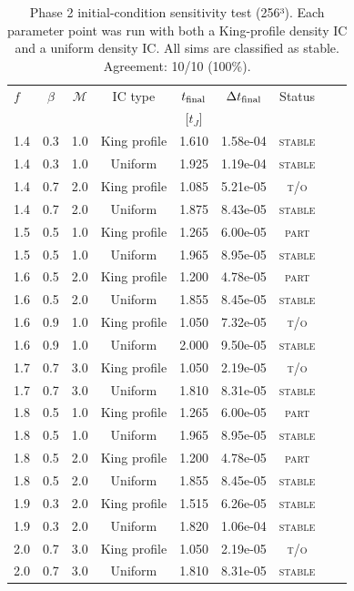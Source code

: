 \begin{table}
\centering
\caption{Phase 2 initial-condition sensitivity test (256³). Each parameter
  point was run with both a King-profile density IC and a uniform density IC.
  All sims are classified as stable. Agreement: 10/10 (100\%).}
\label{tab:phase2_ic}
\begin{tabular}{lcccccccc}
\hline
$f$ & $\beta$ & $\mathcal{M}$ & IC type & $t_{\rm final}$ & $\Delta t_{\rm final}$ & Status \\
 & & & & [$t_J$] & & \\
\hline
  1.4 & 0.3 & 1.0 & King profile & 1.610 & 1.58e-04 & \textsc{stable} \\
  1.4 & 0.3 & 1.0 & Uniform & 1.925 & 1.19e-04 & \textsc{stable} \\
  1.4 & 0.7 & 2.0 & King profile & 1.085 & 5.21e-05 & \textsc{t/o} \\
  1.4 & 0.7 & 2.0 & Uniform & 1.875 & 8.43e-05 & \textsc{stable} \\
  1.5 & 0.5 & 1.0 & King profile & 1.265 & 6.00e-05 & \textsc{part} \\
  1.5 & 0.5 & 1.0 & Uniform & 1.965 & 8.95e-05 & \textsc{stable} \\
  1.6 & 0.5 & 2.0 & King profile & 1.200 & 4.78e-05 & \textsc{part} \\
  1.6 & 0.5 & 2.0 & Uniform & 1.855 & 8.45e-05 & \textsc{stable} \\
  1.6 & 0.9 & 1.0 & King profile & 1.050 & 7.32e-05 & \textsc{t/o} \\
  1.6 & 0.9 & 1.0 & Uniform & 2.000 & 9.50e-05 & \textsc{stable} \\
  1.7 & 0.7 & 3.0 & King profile & 1.050 & 2.19e-05 & \textsc{t/o} \\
  1.7 & 0.7 & 3.0 & Uniform & 1.810 & 8.31e-05 & \textsc{stable} \\
  1.8 & 0.5 & 1.0 & King profile & 1.265 & 6.00e-05 & \textsc{part} \\
  1.8 & 0.5 & 1.0 & Uniform & 1.965 & 8.95e-05 & \textsc{stable} \\
  1.8 & 0.5 & 2.0 & King profile & 1.200 & 4.78e-05 & \textsc{part} \\
  1.8 & 0.5 & 2.0 & Uniform & 1.855 & 8.45e-05 & \textsc{stable} \\
  1.9 & 0.3 & 2.0 & King profile & 1.515 & 6.26e-05 & \textsc{stable} \\
  1.9 & 0.3 & 2.0 & Uniform & 1.820 & 1.06e-04 & \textsc{stable} \\
  2.0 & 0.7 & 3.0 & King profile & 1.050 & 2.19e-05 & \textsc{t/o} \\
  2.0 & 0.7 & 3.0 & Uniform & 1.810 & 8.31e-05 & \textsc{stable} \\
\hline
\end{tabular}
\end{table}

